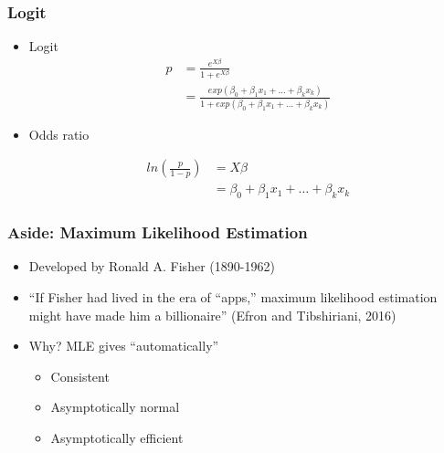 \documentclass[
  shownotes,
  xcolor={svgnames},
  hyperref={colorlinks,citecolor=DarkBlue,linkcolor=andesred,urlcolor=DarkBlue}
  , aspectratio=169]{beamer}
\begin{document}
\begin{frame}[fragile]
\frametitle{Logit}

\begin{itemize}
\item Logit
\begin{align}
p &=\frac{e^{X\beta}}{1+e^{X\beta}} \\ \nonumber
          &=\frac{exp(\beta_0 +\beta_1 x_1 + \dots +\beta_k x_k)}{1+exp(\beta_0 +\beta_1 x_1 + \dots +\beta_k x_k)}
\end{align}

\pause
\item Odds ratio

\begin{align}
ln\left( \frac{p}{1-p}\right) &=X\beta  \\ \nonumber
          &=\beta_0 +\beta_1 x_1 + \dots +\beta_k x_k
\end{align}
\end{itemize}
\end{frame}

\begin{frame}[fragile]
\frametitle{Aside: Maximum Likelihood Estimation}

\begin{itemize}
    
    \item Developed by Ronald A. Fisher (1890-1962)
    \bigskip
    \item ``If Fisher had lived in the era of ``apps,'' maximum likelihood estimation might have made him a billionaire'' (Efron and Tibshiriani, 2016)
    \bigskip
    \item  Why? MLE gives ``automatically''
    \begin{itemize}    
      \bigskip
      \item Consistent 
      \medskip
      \item Asymptotically normal
      \medskip
      \item  Asymptotically efficient
    \end{itemize} 
\end{itemize}
 
\end{frame}
\end{document}
